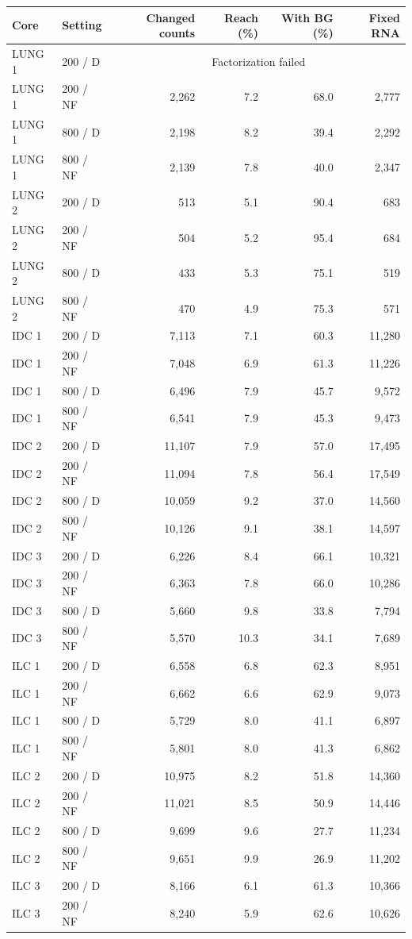 \begin{table}[ht]\centering
\begin{tabular}{llrrrr}\toprule
Core&Setting&Changed counts&Reach (\%)&With BG (\%)&Fixed RNA\\\midrule
LUNG 1&200 / D&\multicolumn{4}{c}{Factorization failed}\\
LUNG 1&200 / NF&2,262&7.2&68.0&2,777\\
LUNG 1&800 / D&2,198&8.2&39.4&2,292\\
LUNG 1&800 / NF&2,139&7.8&40.0&2,347\\
LUNG 2&200 / D&513&5.1&90.4&683\\
LUNG 2&200 / NF&504&5.2&95.4&684\\
LUNG 2&800 / D&433&5.3&75.1&519\\
LUNG 2&800 / NF&470&4.9&75.3&571\\
IDC 1&200 / D&7,113&7.1&60.3&11,280\\
IDC 1&200 / NF&7,048&6.9&61.3&11,226\\
IDC 1&800 / D&6,496&7.9&45.7&9,572\\
IDC 1&800 / NF&6,541&7.9&45.3&9,473\\
IDC 2&200 / D&11,107&7.9&57.0&17,495\\
IDC 2&200 / NF&11,094&7.8&56.4&17,549\\
IDC 2&800 / D&10,059&9.2&37.0&14,560\\
IDC 2&800 / NF&10,126&9.1&38.1&14,597\\
IDC 3&200 / D&6,226&8.4&66.1&10,321\\
IDC 3&200 / NF&6,363&7.8&66.0&10,286\\
IDC 3&800 / D&5,660&9.8&33.8&7,794\\
IDC 3&800 / NF&5,570&10.3&34.1&7,689\\
ILC 1&200 / D&6,558&6.8&62.3&8,951\\
ILC 1&200 / NF&6,662&6.6&62.9&9,073\\
ILC 1&800 / D&5,729&8.0&41.1&6,897\\
ILC 1&800 / NF&5,801&8.0&41.3&6,862\\
ILC 2&200 / D&10,975&8.2&51.8&14,360\\
ILC 2&200 / NF&11,021&8.5&50.9&14,446\\
ILC 2&800 / D&9,699&9.6&27.7&11,234\\
ILC 2&800 / NF&9,651&9.9&26.9&11,202\\
ILC 3&200 / D&8,166&6.1&61.3&10,366\\
ILC 3&200 / NF&8,240&5.9&62.6&10,626\\

\end{tabular}
\end{table}
